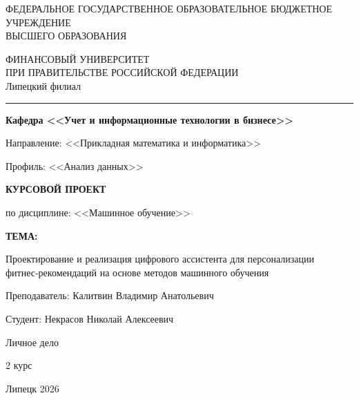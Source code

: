 \documentclass[14pt, a4paper]{extarticle}
\begin{document}
\thispagestyle{empty}

{\scriptsize
\begin{center}
ФЕДЕРАЛЬНОЕ ГОСУДАРСТВЕННОЕ ОБРАЗОВАТЕЛЬНОЕ БЮДЖЕТНОЕ УЧРЕЖДЕНИЕ\\
ВЫСШЕГО ОБРАЗОВАНИЯ
\end{center}
}

{\bf
\begin{center}
ФИНАНСОВЫЙ УНИВЕРСИТЕТ\\
ПРИ ПРАВИТЕЛЬСТВЕ РОССИЙСКОЙ ФЕДЕРАЦИИ\\
Липецкий филиал
\end{center}
}

\hrule
\bigskip

{\small
\begin{center}
\textbf{Кафедра <<Учет и информационные технологии в бизнесе>>}
\end{center}
}

\bigskip

Направление: <<Прикладная математика и информатика>>

\medskip
Профиль: <<Анализ данных>>

\vskip 2cm

\begin{center}
\textbf{КУРСОВОЙ ПРОЕКТ}
\end{center}

по дисциплине: <<Машинное обучение>>

\bigskip

\begin{center}
\textbf{ТЕМА:}\\
\parbox{0.8\textwidth}{
Проектирование и реализация цифрового ассистента для персонализации фитнес‑рекомендаций на основе методов машинного обучения
}
\end{center}

\vskip 4cm

\begin{flushright}
Преподаватель: Калитвин Владимир Анатольевич

Студент: Некрасов Николай Алексеевич

Личное дело 

2 курс
\end{flushright}

\vfill

\begin{center}
Липецк 2026
\end{center}




\linespread{1.3} %
\end{document}
